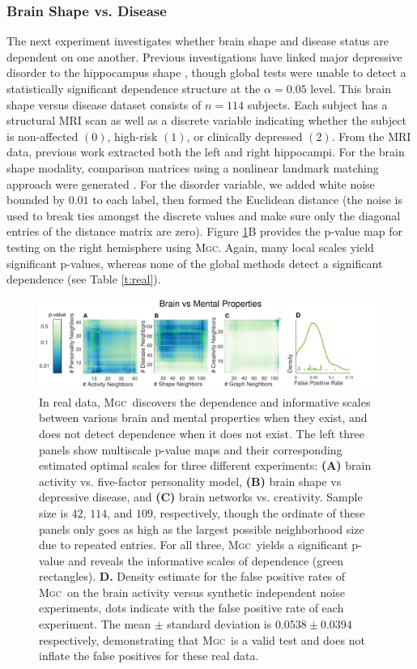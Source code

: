 \documentclass[11pt]{article}
\providecommand{\sct}[1]{{\normalfont\textsc{#1}}}
\newcommand{\Mgc}{\sct{Mgc}}
\begin{document}
\subsubsection*{Brain Shape vs. Disease} 


The next experiment investigates whether brain shape and disease status are dependent on one another.  Previous investigations have linked major depressive disorder to the hippocampus shape \cite{ParkEtAl2008,PosenerEtAl2003}, though global tests were unable to detect a statistically significant dependence structure at the $\alpha=0.05$ level.
This brain shape versus disease dataset consists of $n=114$ subjects. Each subject has a structural MRI scan as well as a discrete variable indicating whether the subject is non-affected $(0)$, high-risk $(1)$, or clinically depressed $(2)$.  From the MRI data, previous work extracted both the left and right hippocampi. For the brain shape modality, comparison matrices using a nonlinear landmark matching approach were generated \cite{ParkEtAl2008,BegEtAl2005}. For the disorder variable, we added white noise bounded by $0.01$ to each label, then formed the Euclidean distance (the noise is used to break ties amongst the discrete values and make sure only the diagonal entries of the distance matrix are zero).
% 
Figure \ref{f:real}{\color{magenta}B} provides the p-value map for testing on the right hemisphere using \Mgc. Again, many local scales yield significant p-values, whereas none of the global methods detect a significant dependence  (see Table \ref{t:real}). 

\begin{figure}[htbp]
\includegraphics[width=1.0\textwidth,trim={0 0 1.5cm 0},clip]{Figures/FigReal}
\caption{In real data, \Mgc~discovers the dependence and informative scales between various brain and mental properties when they exist, and does not detect dependence when it does not exist.  The left three panels show multiscale p-value maps and their corresponding estimated optimal scales for three different experiments: \textbf{(A)}  brain activity vs. five-factor personality model, \textbf{(B)}  brain shape vs depressive disease, and \textbf{(C)} brain networks vs. creativity. Sample size is $42$, $114$, and $109$, respectively, though the ordinate of these panels only goes as high as the largest possible neighborhood size due to repeated entries.  
For all three, \Mgc~yields a significant p-value and reveals the informative scales of dependence (green rectangles).
\textbf{D.} Density estimate for the false positive rates of  \Mgc~on the brain activity versus synthetic independent noise experiments, dots indicate with the false positive rate of each experiment. The mean $\pm$ standard deviation is $0.0538 \pm 0.0394$ respectively, demonstrating that \Mgc~is a valid test and does not inflate the false positives for these real data.}
\label{f:real}
\end{figure}
\end{document}
